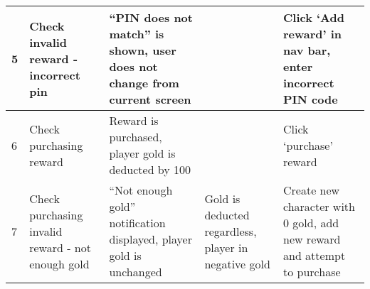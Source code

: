 \begin{landscape}
\begin{tabularx}{\linewidth}{p{1cm} X X X X}
5            & Check invalid reward - incorrect pin              & ``PIN does not match'' is shown, user does not change from current screen         &                                                       & Click `Add reward' in nav bar, enter incorrect PIN code                             \\ \hline
6            & Check purchasing reward                           & Reward is purchased, player gold is deducted by 100                                     &                                                       & Click `purchase' reward                                                             \\ \hline
7            & Check purchasing invalid reward - not enough gold & ``Not enough gold'' notification displayed, player gold is unchanged                    & Gold is deducted regardless, player in negative gold & Create new character with 0 gold, add new reward and attempt to purchase            \\ \hline
\end{tabularx} 


\end{landscape}
